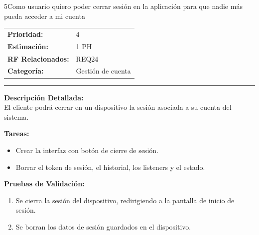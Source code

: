 \begin{hu_card}{5}{Como usuario quiero poder cerrar sesión en la aplicación para que nadie más pueda acceder a mi cuenta}
    \begin{tabularx}{\linewidth}{l X}
        \textbf{Prioridad:}   & 4 \\
        \textbf{Estimación:}  & 1 PH \\
        \textbf{RF Relacionados:} & REQ24\\
        \textbf{Categoría:} & Gestión de cuenta \\
    \end{tabularx}

    \vspace{2mm}
    \hrule
    \vspace{2mm}

    \textbf{Descripción Detallada:} \\
    El cliente podrá cerrar en un dispositivo la sesión asociada a su cuenta del sistema.

    \vspace{2mm}
    \textbf{Tareas:}
    \begin{itemize}[noitemsep, topsep=0pt]
        \item Crear la interfaz con botón de cierre de sesión.
        \item Borrar el token de sesión, el historial, los listeners y el estado.
    \end{itemize}

    \vspace{2mm}
    \textbf{Pruebas de Validación:}
    \begin{enumerate}[noitemsep, topsep=0pt]
        \item Se cierra la sesión del dispositivo, redirigiendo a la pantalla de inicio de sesión.
        \item Se borran los datos de sesión guardados en el dispositivo.
    \end{enumerate}
\end{hu_card}

